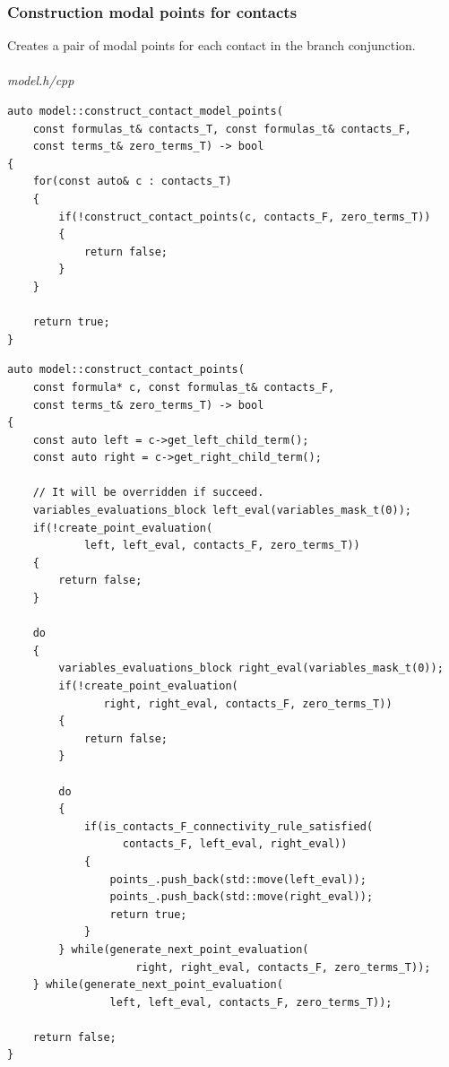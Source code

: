 \documentclass{article}
\begin{document}
	\newpage
	\subsubsection*{Construction modal points for contacts}
	Creates a pair of modal points for each contact in the branch conjunction.
\\
\\
\noindent
\textit{model.h/cpp}
\begin{lstlisting}
auto model::construct_contact_model_points(
	const formulas_t& contacts_T, const formulas_t& contacts_F,
	const terms_t& zero_terms_T) -> bool
{
    for(const auto& c : contacts_T)
    {
        if(!construct_contact_points(c, contacts_F, zero_terms_T))
        {
            return false;
        }
    }

    return true;
}
\end{lstlisting}
\newpage
\begin{lstlisting}
auto model::construct_contact_points(
	const formula* c, const formulas_t& contacts_F,
	const terms_t& zero_terms_T) -> bool
{
    const auto left = c->get_left_child_term();
    const auto right = c->get_right_child_term();

    // It will be overridden if succeed.
    variables_evaluations_block left_eval(variables_mask_t(0));
    if(!create_point_evaluation(
            left, left_eval, contacts_F, zero_terms_T))
    {
        return false;
    }

    do
    {
        variables_evaluations_block right_eval(variables_mask_t(0));
        if(!create_point_evaluation(
               right, right_eval, contacts_F, zero_terms_T))
        {
            return false;
        }

        do
        {
            if(is_contacts_F_connectivity_rule_satisfied(
                  contacts_F, left_eval, right_eval))
            {
                points_.push_back(std::move(left_eval));
                points_.push_back(std::move(right_eval));
                return true;
            }
        } while(generate_next_point_evaluation(
                    right, right_eval, contacts_F, zero_terms_T));
    } while(generate_next_point_evaluation(
                left, left_eval, contacts_F, zero_terms_T));

    return false;
}
\end{lstlisting}

	\newpage
\end{document}
